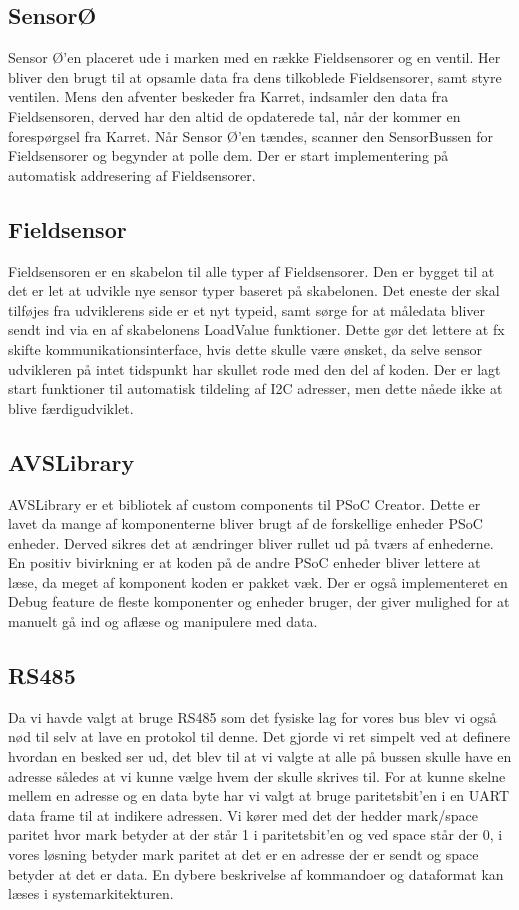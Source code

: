 \subsection{SensorØ}
Sensor Ø'en placeret ude i marken med en række Fieldsensorer og en ventil. Her bliver den brugt til at opsamle data fra dens tilkoblede Fieldsensorer, samt styre ventilen. Mens den afventer beskeder fra Karret, indsamler den data fra Fieldsensoren, derved har den altid de opdaterede tal, når der kommer en forespørgsel fra Karret. Når Sensor Ø'en tændes, scanner den SensorBussen for Fieldsensorer og begynder at polle dem. Der er start implementering på automatisk addresering af Fieldsensorer. 

\subsection{Fieldsensor}
Fieldsensoren er en skabelon til alle typer af Fieldsensorer. Den er bygget til at det er let at udvikle nye sensor typer baseret på skabelonen. Det eneste der skal tilføjes fra udviklerens side er et nyt typeid, samt sørge for at måledata bliver sendt ind via en af skabelonens LoadValue funktioner. Dette gør det lettere at fx skifte kommunikationsinterface, hvis dette skulle være ønsket, da selve sensor udvikleren på intet tidspunkt har skullet rode med den del af koden. Der er lagt start funktioner til automatisk tildeling af I2C adresser, men dette nåede ikke at blive færdigudviklet.

\subsection{AVSLibrary}
AVSLibrary er et bibliotek af custom components til PSoC Creator. Dette er lavet da mange af komponenterne bliver brugt af de forskellige enheder PSoC enheder. Derved sikres det at ændringer bliver rullet ud på tværs af enhederne. En positiv bivirkning er at koden på de andre PSoC enheder bliver lettere at læse, da meget af komponent koden er pakket væk. Der er også implementeret en Debug feature de fleste komponenter og enheder bruger, der giver mulighed for at manuelt gå ind og aflæse og manipulere med data.

\subsection{RS485}
Da vi havde valgt at bruge RS485 som det fysiske lag for vores bus blev vi også nød til selv at lave en protokol til denne. Det gjorde vi ret simpelt ved at definere hvordan en besked ser ud, det blev til at vi valgte at alle på bussen skulle have en adresse således at vi kunne vælge hvem der skulle skrives til. For at kunne skelne mellem en adresse og en data byte har vi valgt at bruge paritetsbit'en i en UART data frame til at indikere adressen. Vi kører med det der hedder mark/space paritet hvor mark betyder at der står 1 i paritetsbit'en og ved space står der 0, i vores løsning betyder mark paritet at det er en adresse der er sendt og space betyder at det er data. En dybere beskrivelse af kommandoer og dataformat kan læses i systemarkitekturen.